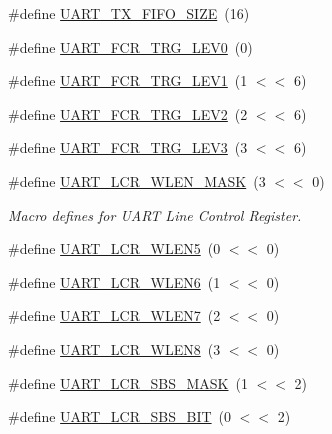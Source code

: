 \begin{DoxyCompactItemize}
\item 
\#define \hyperlink{group___u_a_r_t__18_x_x__43_x_x_ga94b76465adbb4fb96c821ef0866cbd0f}{U\+A\+R\+T\+\_\+\+T\+X\+\_\+\+F\+I\+F\+O\+\_\+\+S\+I\+ZE}~(16)
\item 
\#define \hyperlink{group___u_a_r_t__18_x_x__43_x_x_gaba4b4e15936a075bf5054776fbd59676}{U\+A\+R\+T\+\_\+\+F\+C\+R\+\_\+\+T\+R\+G\+\_\+\+L\+E\+V0}~(0)
\item 
\#define \hyperlink{group___u_a_r_t__18_x_x__43_x_x_ga264238c2dde9248a73d679c32a74004b}{U\+A\+R\+T\+\_\+\+F\+C\+R\+\_\+\+T\+R\+G\+\_\+\+L\+E\+V1}~(1 $<$$<$ 6)
\item 
\#define \hyperlink{group___u_a_r_t__18_x_x__43_x_x_ga7b655aba90b695210e7ce9f7b00cea89}{U\+A\+R\+T\+\_\+\+F\+C\+R\+\_\+\+T\+R\+G\+\_\+\+L\+E\+V2}~(2 $<$$<$ 6)
\item 
\#define \hyperlink{group___u_a_r_t__18_x_x__43_x_x_ga9e6ef12c7a1f3514d6e30d7548ed3e46}{U\+A\+R\+T\+\_\+\+F\+C\+R\+\_\+\+T\+R\+G\+\_\+\+L\+E\+V3}~(3 $<$$<$ 6)
\item 
\#define \hyperlink{group___u_a_r_t__18_x_x__43_x_x_ga0d00b51fd6ca0b80b89af4044d94bbc0}{U\+A\+R\+T\+\_\+\+L\+C\+R\+\_\+\+W\+L\+E\+N\+\_\+\+M\+A\+SK}~(3 $<$$<$ 0)
\begin{DoxyCompactList}\small\item\em Macro defines for U\+A\+RT Line Control Register. \end{DoxyCompactList}\item 
\#define \hyperlink{group___u_a_r_t__18_x_x__43_x_x_ga2c64fd92092b8ac1e64b6b1204927682}{U\+A\+R\+T\+\_\+\+L\+C\+R\+\_\+\+W\+L\+E\+N5}~(0 $<$$<$ 0)
\item 
\#define \hyperlink{group___u_a_r_t__18_x_x__43_x_x_ga916fcefe6db8651be1cb1c066726381d}{U\+A\+R\+T\+\_\+\+L\+C\+R\+\_\+\+W\+L\+E\+N6}~(1 $<$$<$ 0)
\item 
\#define \hyperlink{group___u_a_r_t__18_x_x__43_x_x_ga7746eb5a2aac4b9f86e97ee82e5e2a10}{U\+A\+R\+T\+\_\+\+L\+C\+R\+\_\+\+W\+L\+E\+N7}~(2 $<$$<$ 0)
\item 
\#define \hyperlink{group___u_a_r_t__18_x_x__43_x_x_ga71ecde192fb0c9facb9ef9c6b77cc687}{U\+A\+R\+T\+\_\+\+L\+C\+R\+\_\+\+W\+L\+E\+N8}~(3 $<$$<$ 0)
\item 
\#define \hyperlink{group___u_a_r_t__18_x_x__43_x_x_ga99a703d7a010edb3c940b54537ccdb08}{U\+A\+R\+T\+\_\+\+L\+C\+R\+\_\+\+S\+B\+S\+\_\+\+M\+A\+SK}~(1 $<$$<$ 2)
\item 
\#define \hyperlink{group___u_a_r_t__18_x_x__43_x_x_ga70ccdedb76a079b8e7c87e5c3709469c}{U\+A\+R\+T\+\_\+\+L\+C\+R\+\_\+\+S\+B\+S\+\_\+B\+IT}~(0 $<$$<$ 2)

\end{DoxyCompactItemize}
